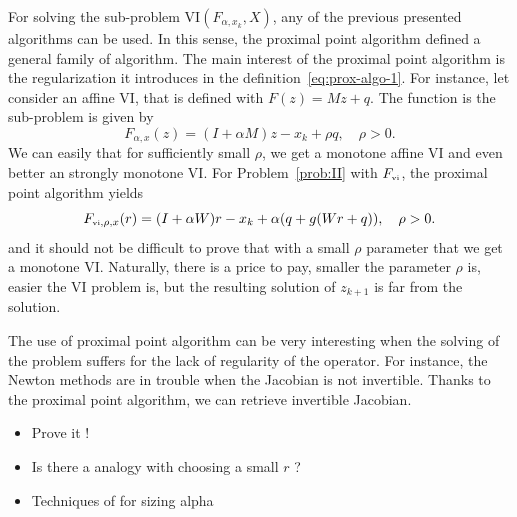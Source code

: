For solving the sub-problem $\mathrm{VI}(F_{\alpha,x_k},X)$, any of the previous presented algorithms can be used. In this sense, the proximal point algorithm defined a general family of algorithm. The main interest of the proximal point algorithm is the regularization it introduces in the  definition~\eqref{eq:prox-algo-1}. For instance, let consider an affine VI, that is defined with $F(z)=M z+q$. The function is the sub-problem is given by
\begin{equation}
  \label{eq:prox-algo-4}
   F_{\alpha,x}(z) = (I + \alpha M) z - x_k + \rho q , \quad \rho > 0 .
\end{equation}
We can easily that for sufficiently small $\rho$, we get a monotone affine VI and even better an strongly monotone VI. For Problem~\ref{prob:II} with $F_{{\hbox{\tiny{vi}}}}$, the proximal point algorithm yields
\begin{equation}
  \label{eq:prox-algo-5}
   F_{\vitwo,\rho,x}(r) = (I + \alpha W) r - x_k + \alpha( q + g(W r +q )) , \quad \rho > 0 .
\end{equation}
and it should not be difficult to prove that with a small $\rho$ parameter that we get a monotone VI.  Naturally, there is a price to pay, smaller the parameter $\rho$ is, easier the VI problem is, but the resulting solution of $z_{k+1}$ is far from the solution.

The use of proximal point algorithm can be very interesting when the solving of the problem suffers for the lack of regularity of the operator. For instance, the Newton methods are in trouble when the Jacobian is not invertible. Thanks to the proximal point algorithm, we can retrieve invertible Jacobian.


\begin{ndrva}
  \begin{itemize}
  \item Prove it !
  \item Is there a analogy with choosing a small $r$ ?
  \item Techniques of \citep{Han_JCAM2008} for sizing alpha
  \end{itemize}
\end{ndrva}

